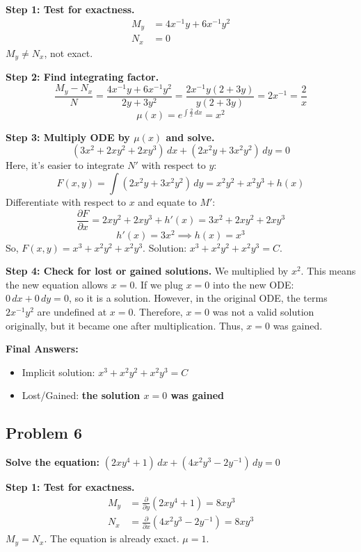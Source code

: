 \documentclass[11pt]{article}
\begin{document}
\textbf{Step 1: Test for exactness.}
\begin{align*}
    M_y &= 4x^{-1}y + 6x^{-1}y^2 \\
    N_x &= 0
\end{align*}
$M_y \neq N_x$, not exact.

\textbf{Step 2: Find integrating factor.}
\[ \frac{M_y - N_x}{N} = \frac{4x^{-1}y + 6x^{-1}y^2}{2y + 3y^2} = \frac{2x^{-1}y(2 + 3y)}{y(2 + 3y)} = 2x^{-1} = \frac{2}{x} \]
\[ \mu(x) = e^{\int \frac{2}{x} \, dx} = x^2 \]

\textbf{Step 3: Multiply ODE by $\mu(x)$ and solve.}
\[ (3x^2 + 2xy^2 + 2xy^3) \, dx + (2x^2y + 3x^2y^2) \, dy = 0 \]
Here, it's easier to integrate $N'$ with respect to $y$:
\[ F(x, y) = \int (2x^2y + 3x^2y^2) \, dy = x^2y^2 + x^2y^3 + h(x) \]
Differentiate with respect to $x$ and equate to $M'$:
\[ \frac{\partial F}{\partial x} = 2xy^2 + 2xy^3 + h'(x) = 3x^2 + 2xy^2 + 2xy^3 \]
\[ h'(x) = 3x^2 \implies h(x) = x^3 \]
So, $F(x, y) = x^3 + x^2y^2 + x^2y^3$. Solution: $x^3 + x^2y^2 + x^2y^3 = C$.

\textbf{Step 4: Check for lost or gained solutions.} We multiplied by $x^2$. This means the new equation allows $x = 0$. If we plug $x = 0$ into the new ODE: $0 \, dx + 0 \, dy = 0$, so it is a solution. However, in the original ODE, the terms $2x^{-1}y^2$ are undefined at $x = 0$. Therefore, $x = 0$ was not a valid solution originally, but it became one after multiplication. Thus, $x = 0$ was gained.

\textbf{Final Answers:}
\begin{itemize}
    \item Implicit solution: $x^3 + x^2y^2 + x^2y^3 = C$
    \item Lost/Gained: \textbf{the solution $x = 0$ was gained}
\end{itemize}

\hrulefill

\subsection*{Problem 6}
\textbf{Solve the equation:} $(2xy^4 + 1) \, dx + (4x^2y^3 - 2y^{-1}) \, dy = 0$

\textbf{Step 1: Test for exactness.}
\begin{align*}
    M_y &= \frac{\partial}{\partial y}(2xy^4 + 1) = 8xy^3 \\
    N_x &= \frac{\partial}{\partial x}(4x^2y^3 - 2y^{-1}) = 8xy^3
\end{align*}
$M_y = N_x$. The equation is already exact. $\mu = 1$.
\end{document}
